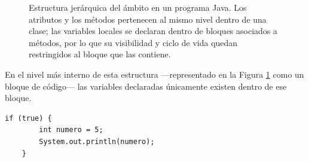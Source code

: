 \documentclass[12pt,twoside]{book}
\begin{document}
						\begin{figure}[H]
							\centering
							
							
							\caption[Ámbitos de variables en Java]{Estructura jerárquica del ámbito en un programa Java. Los atributos y los métodos pertenecen al mismo nivel dentro de una clase; las variables locales se declaran dentro de bloques asociados a métodos, por lo que su visibilidad y ciclo de vida quedan restringidos al bloque que las contiene.}
							\label{fig:ambito_variables_java}
							
						\end{figure}
						
						\noindent
						En el nivel más interno de esta estructura —representado en la Figura \ref{fig:ambito_variables_java} como un bloque de código— las variables declaradas únicamente existen dentro de ese bloque.
						
						\begin{lstlisting}[style=Java,caption={Variable con ámbito limitado a un bloque de código.},label={lst:AmbitoVariable}]
	if (true) {
		int numero = 5;
		System.out.println(numero);
	}
						\end{lstlisting}
						
\end{document}

